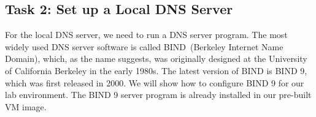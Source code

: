 \begin{comment}
To avoid this, we should tell the DHCP client not to set the
DNS server automatically. This can be achieved using the following procedure (for \ubuntu
16.04):


\begin{enumerate}
  \item Go to \texttt{"System Settings"}, and click the \texttt{"Network"} icon.
  \item Choose the \texttt{"Wired"} tab, and click the
        \texttt{"Options"} button. A dialog will pop up.

  \item Click the \texttt{ "IPv4 Settings"} tab.  In the \texttt{"Method"} entry, choose
        \texttt{"Automatic (DHCP) Addresses Only"}, and then type the IP address of the local DNS
        server in the \texttt{"DNS servers"} entry. We do not need to type anything in the
        other two fields~(See Figure~\ref{dns:fig:user_machine_setup}).

  \item Finally, click the network icon on the top right corner of the desktop, and Select
    \texttt{"Wired connection 1"}. This will refresh the wired network connection and updates the changes.
    It should be noted that \texttt{"Wired connection 1"} is the name that we choose for our
    connection (see Figure~\ref{dns:fig:user_machine_setup});  we can choose a
    different name.
\end{enumerate}


\begin{figure}[htb]
  \begin{center}
    \texttt{[image: \\dnsFigs/config\_local\_dns\_server.pdf]}
  \end{center}
  \caption{User machine setup}
  \label{dns:fig:user_machine_setup}
\end{figure}

\end{comment}


\subsection{Task 2: Set up a Local DNS Server}

For the local DNS server, we need to run a DNS server program.  The most
widely used DNS server software is called BIND~(Berkeley Internet Name
Domain), which, as the name suggests, was originally designed at the
University of California Berkeley in the early 1980s.  The latest version
of BIND is BIND 9, which was first released in 2000. We will show how to
configure BIND 9 for our lab environment.
The BIND 9 server program is already installed in our pre-built
\ubuntu VM image.


